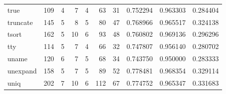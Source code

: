 \begin{tabular}{lrrrrrrrrr}
true      &                    109 &                                  4 &                                 7 &                                4 &                                63 &                              31 &                                0.752294 &                               0.963303 &                             0.284404 \\
truncate  &                    145 &                                  5 &                                 8 &                                5 &                                80 &                              47 &                                0.768966 &                               0.965517 &                             0.324138 \\
tsort     &                    162 &                                  5 &                                10 &                                6 &                                93 &                              48 &                                0.760802 &                               0.969136 &                             0.296296 \\
tty       &                    114 &                                  5 &                                 7 &                                4 &                                66 &                              32 &                                0.747807 &                               0.956140 &                             0.280702 \\
uname     &                    120 &                                  6 &                                 7 &                                5 &                                68 &                              34 &                                0.743750 &                               0.950000 &                             0.283333 \\
unexpand  &                    158 &                                  5 &                                 7 &                                5 &                                89 &                              52 &                                0.778481 &                               0.968354 &                             0.329114 \\
uniq      &                    202 &                                  7 &                                10 &                                6 &                               112 &                              67 &                                0.774752 &                               0.965347 &                             0.331683 \\

\end{tabular}
